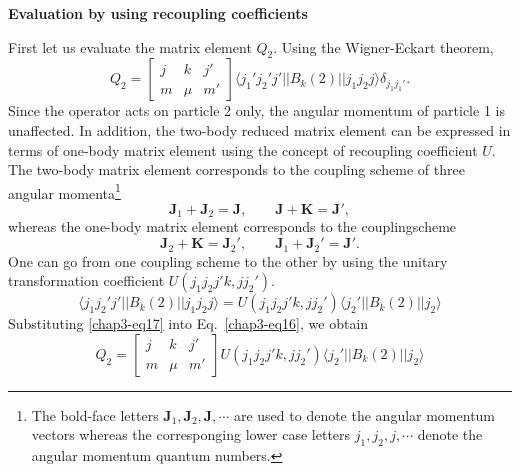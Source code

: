 \medskip
\noindent \textbf{\large Evaluation by using recoupling coefficients}
\medskip

\noindent First let us evaluate the matrix element $Q_2$. Using the Wigner-Eckart theorem,
\begin{equation}
Q_2 = \begin{bmatrix}j & k & j'\\m & \mu & m'\end{bmatrix}
\langle j_1' j_2' j' || B_k (2) || j_1 j_2 j \rangle \delta_{j_1 j_1'}. \label{chap3-eq16}
\end{equation}
Since the operator acts on particle 2 only, the angular momentum of particle 1 is unaffected. In addition, the two-body reduced matrix element can be expressed in terms of one-body matrix element using the concept of recoupling coefficient $U$. The two-body matrix element corresponds to the coupling scheme of three angular momenta\footnote{The bold-face letters ${\boldsymbol  J}_1, {\boldsymbol  J}_2, {\boldsymbol  J}, \cdots$ are used to denote the angular momentum vectors whereas the corresponging lower case letters $j_1, j_2, j, \cdots$ denote the angular momentum quantum numbers.}
$$
{\boldsymbol  J}_1 + {\boldsymbol  J}_2 = {\boldsymbol  J}, \qquad {\boldsymbol  J}+ {\boldsymbol  K}= {\boldsymbol  J}',
$$
whereas the one-body matrix element corresponds to the coupling\break scheme
$$
{\boldsymbol  J}_2 + {\boldsymbol  K} = {\boldsymbol  J}_2', \qquad {\boldsymbol  J}_1+ {\boldsymbol  J}_2'= {\boldsymbol  J}'.
$$
One can go from one coupling scheme to the other by using the unitary transformation coefficient $U(j_1 j_2 j' k, j j_2')$.
\begin{equation}
\langle j_1 j_2' j' || B_k (2) || j_1 j_2 j \rangle = U (j_1 j_2 j' k, j j_2') \langle j_2' || B_k (2) || j_2\rangle \label{chap3-eq17}
\end{equation}
Substituting \eqref{chap3-eq17} into Eq.\ \eqref{chap3-eq16}, we obtain
\begin{equation}
Q_2 = \begin{bmatrix}j & k & j'\\m & \mu & m'\end{bmatrix}
U (j_1 j_2 j' k, j j_2') \langle j_2' || B_k (2) || j_2\rangle \label{chap3-eq18}
\end{equation}


